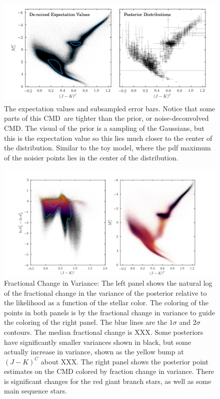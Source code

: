 \documentclass[modern]{aastex61}
\newcommand{\acronym}[1]{{\small{#1}}}
\newcommand{\cmd}{\acronym{CMD}}
\begin{document}
\begin{figure}
\centering
  \includegraphics[width=\textwidth]{posteriorCMD.png}
\caption{The expectation values and subsampled error bars. Notice that some parts of this \cmd\ are tighter than the prior, or noise-deconvolved \cmd. The visual of the prior is a sampling of the Gaussians, but this is the expectation value so this lies much closer to the center of the distribution. Similar to the toy model, where the pdf maximum of the noisier points lies in the center of the distribution.}
\label{fig:posteriorCMD}
\end{figure}


\begin{figure}
\centering
\includegraphics[width=\textwidth]{delta.png}
\caption{Fractional Change in Variance: The left panel shows the natural log of the fractional change in the variance of the posterior relative to the likelihood as a function of the stellar color. The coloring of the points in both panels is by the fractional change in variance to guide the coloring of the right panel. The blue lines are the $1\sigma$ and $2\sigma$ contours. The median fractional change is XXX. Some posteriors have significantly smaller variances shown in black, but some actually increase in variance, shown as the yellow bump at $(J-K)^C$ about XXX. The right panel shows the posterior point estimates on the CMD colored by fraction change in variance. There is significant changes for the red giant branch stars, as well as some main sequence stars.}
\label{fig:delta}
\end{figure}
\end{document}

